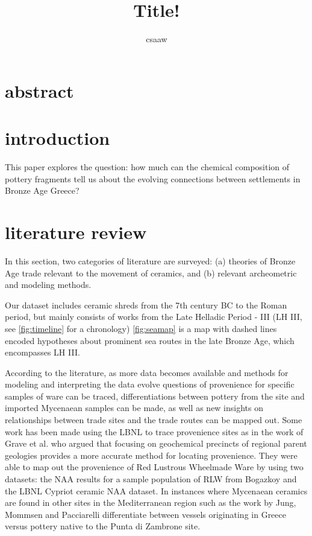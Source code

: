 \documentclass[10pt,a4paper]{article}
\author{csaaw}
\title{Title!}
\begin{document}
\maketitle

\section*{abstract}

\section{introduction}
\label{sec:intro}

This paper explores the question: how much can the chemical composition of pottery fragments tell us about the evolving connections between settlements in Bronze Age Greece? 




\section{literature review}
\label{sec:litrev}

In this section, two categories of literature are surveyed: (a) theories of Bronze Age trade relevant to the movement of ceramics, and (b) relevant archeometric and modeling methods.

Our dataset includes ceramic shreds from the 7th century BC to the Roman period, but mainly consists of works from the Late Helladic Period - III (LH III, see \cref{fig:timeline} for a chronology)
\cref{fig:seamap} is a map with dashed lines encoded hypotheses about prominent sea routes in the late Bronze Age, which encompasses LH III. 

According to the literature, as more data becomes available and methods for modeling and interpreting the data evolve questions of provenience for specific samples of ware can be traced, differentiations between pottery from the site and imported Mycenaean samples can be made, as well as new insights on relationships between trade sites and the trade routes can be mapped out.  Some work has been made using the LBNL to trace provenience sites as in the work of Grave et al.\cite{grave2014ceramics} who argued that focusing on geochemical precincts of regional parent geologies provides a more accurate method for locating provenience.  They were able to map out the provenience of Red Lustrous Wheelmade Ware by using two datasets:  the NAA results for a sample population of RLW from Bogazkoy and the LBNL Cypriot ceramic NAA dataset.  In instances where Mycenaean ceramics are found in other sites in the Mediterranean region such as the work by Jung, Mommsen and Pacciarelli\cite{jung2015west} differentiate between vessels originating in Greece versus pottery native to the Punta di Zambrone site.  
\end{document}
